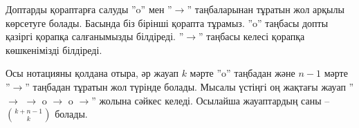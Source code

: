 \begin{center}
\end{center}

Доптарды қораптарға салуды 
''o'' мен ''$\rightarrow$'' таңбаларынан тұратын
жол арқылы көрсетуге болады. Басында біз 
бірінші қорапта тұрамыз. ''o'' таңбасы допты қазіргі қорапқа
салғанымызды білдіреді. ''$\rightarrow$'' таңбасы 
келесі қорапқа көшкенімізді білдіреді. 
 

Осы нотацияны қолдана отыра, әр жауап $k$ мәрте 
''o'' таңбадан және $n-1$ мәрте ''$\rightarrow$'' таңбадан
тұратын жол түрінде болады. Мысалы үстіңгі оң жақтағы жауап
''$\rightarrow$ $\rightarrow$ o $\rightarrow$ o $\rightarrow$'' жолына
сәйкес келеді. Осылайша жауаптардың саны -- ${k+n-1 \choose k}$ болады.


